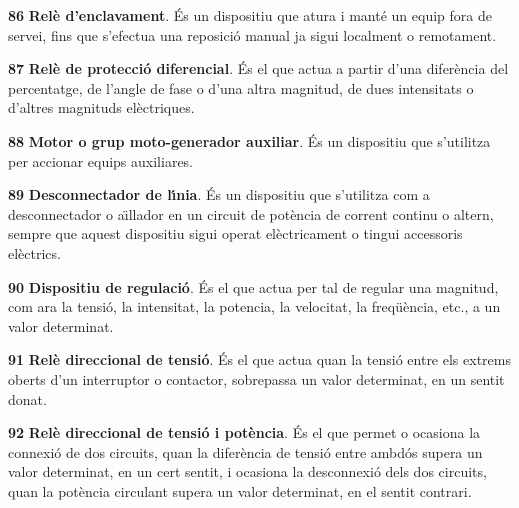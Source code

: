 \begin{multicols}{2}
\begin{list}{}
\item[\textbf{86}]   
\textbf{Rel\`{e} d'enclavament}. \'{E}s un dispositiu que atura i mant\'{e} un equip fora de servei, fins que s'efectua una reposici\'{o} manual ja sigui localment o remotament.

\item[\textbf{87}]   
\textbf{Rel\`{e} de protecci\'{o}
diferencial}. \'{E}s el que actua a partir d'una difer\`{e}ncia  del percentatge, de l'angle de fase o d'una altra magnitud, de dues intensitats
o d'altres magnituds el\`{e}ctriques.

\item[\textbf{88}]  
 \textbf{Motor o grup
moto-generador auxiliar}. \'{E}s un dispositiu que s'utilitza per
accionar equips auxiliares.

\item[\textbf{89}]  
 \textbf{Desconnectador de l\'{\i}nia}. \'{E}s
un dispositiu que s'utilitza com a desconnectador o a\"{\i}llador en un
circuit de pot\`{e}ncia de corrent continu o altern, sempre que aquest
dispositiu sigui operat el\`{e}ctricament o tingui accessoris el\`{e}ctrics.

\item[\textbf{90}]   
\textbf{Dispositiu de regulaci\'{o}}. \'{E}s el que
actua per tal de regular una magnitud, com ara la tensi\'{o}, la intensitat, la potencia,
la velocitat, la freq\"{u}\`{e}ncia, etc., a un valor determinat.

\item[\textbf{91}]   
\textbf{Rel\`{e} direccional de tensi\'{o}}.
\'{E}s el que actua quan la tensi\'{o} entre els extrems oberts d'un
interruptor o contactor, sobrepassa un valor determinat, en un
sentit donat.

\item[\textbf{92}]   
\textbf{Rel\`{e} direccional
de tensi\'{o} i pot\`{e}ncia}. \'{E}s el que permet o ocasiona la connexi\'{o} de
dos circuits, quan la difer\`{e}ncia de tensi\'{o} entre ambd\'{o}s supera un
valor determinat, en un cert sentit, i ocasiona la desconnexi\'{o} dels
dos circuits, quan la pot\`{e}ncia circulant supera un valor determinat,
en el sentit contrari.


\end{list}
\end{multicols}
